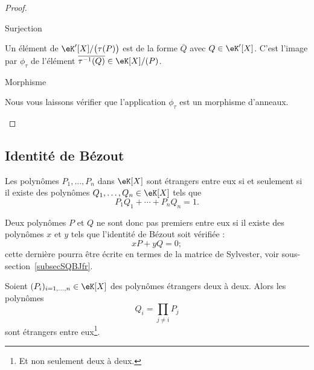 \begin{proof}
\begin{subproof}
		\item[Surjection]

		Un élément de \( \eK'[X]/\big( \tau(P) \big)\) est de la forme \( \bar Q\) avec \( Q\in \eK'[X]\). C'est l'image par \( \phi_{\tau}\) de l'élément \( \overline{ \tau^{-1}(Q) }\in \eK[X]/(P)\).

		\item[Morphisme]

		Nous vous laissons vérifier que l'application \( \phi_{\tau}\) est un morphisme d'anneaux.

	\end{subproof}
\end{proof}

\subsection{Identité de Bézout}

\begin{theorem}[Bézout] \label{ThoBezoutOuGmLB}
	Les polynômes \( P_1,\ldots,P_n\) dans \( \eK[X]\) sont étrangers entre eux si et seulement si il existe des polynômes \( Q_1,\ldots,Q_n\in\eK[X]\) tels que
	\begin{equation}
		P_1Q_1+\cdots+P_nQ_n=1.
	\end{equation}
\end{theorem}

Deux polynômes \( P\) et \( Q\) ne sont donc pas premiers entre eux si il existe des polynômes \( x\) et \( y\) tels que l'identité de Bézout soit vérifiée :
\begin{equation}    \label{EqkbbzAi}
	xP+yQ=0;
\end{equation}
cette dernière pourra être écrite en termes de la matrice de Sylvester, voir sous-section~\ref{subsecSQBJfr}.

\begin{lemma}       \label{LemuALZHn}
	Soient \( (P_i)_{i=1,\ldots,n}\in \eK[X]\) des polynômes étrangers deux à deux. Alors les polynômes \begin{equation} Q_i=\prod_{j\neq i}P_j \end{equation}
	sont étrangers entre eux\footnote{Et non seulement deux à deux.}.
\end{lemma}

